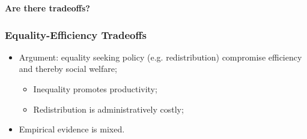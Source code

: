 \documentclass[aspectratio=169]{beamer}
\theoremstyle{principle}
\begin{document}



\begin{frame}

\begin{center}
\Huge\textbf{Are there tradeoffs?}
\end{center}

\end{frame}

\begin{frame}
\frametitle{Equality-Efficiency Tradeoffs}
\begin{itemize}
\item Argument: equality seeking policy (e.g. redistribution) compromise efficiency and thereby social welfare;
\begin{itemize}
\item Inequality promotes productivity;
\item Redistribution is administratively costly;
\end{itemize}
\bigskip
\bigskip
\item Empirical evidence is mixed.
\end{itemize}

\end{frame}
\end{document}
